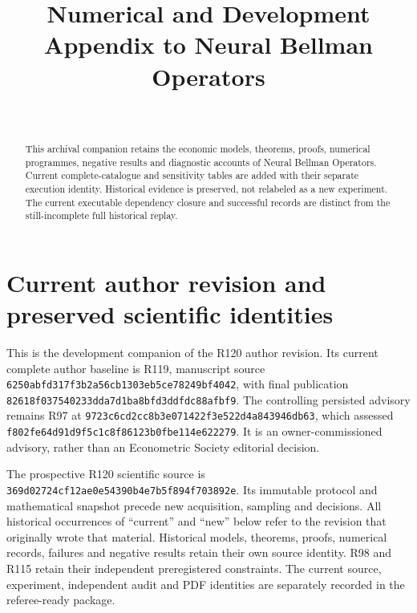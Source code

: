 \documentclass[ecta,nameyear,draft]{econsocart}
\begin{document}
\begin{frontmatter}
\title{Numerical and Development Appendix to Neural Bellman Operators}
\begin{aug}
\author[id=au1,addressref={add1}]{~}
\address[id=add1]{Peking University}
\end{aug}
\begin{abstract}This archival companion retains the economic models, theorems, proofs, numerical programmes, negative results and diagnostic accounts of Neural Bellman Operators. Current complete-catalogue and sensitivity tables are added with their separate execution identity. Historical evidence is preserved, not relabeled as a new experiment. The current executable dependency closure and successful records are distinct from the still-incomplete full historical replay.\end{abstract}
\end{frontmatter}
\appendix
\renewcommand{\thetheorem}{A.\arabic{theorem}}
\renewcommand{\theequation}{A.\arabic{equation}}
\renewcommand{\thesection}{\AlphAlph{\value{section}}}
\section{Current author revision and preserved scientific identities}\label{dev:custody120}
This is the development companion of the R120 author revision. Its current
complete author baseline is R119, manuscript source
\nolinkurl{6250abfd317f3b2a56cb1303eb5ce78249bf4042}, with final publication
\nolinkurl{82618f037540233dda7d1ba8bfd3ddfdc88afbf9}. The controlling persisted
advisory remains R97 at
\nolinkurl{9723c6cd2cc8b3e071422f3e522d4a843946db63}, which assessed
\nolinkurl{f802fe64d91d9f5c1c8f86123b0fbe114e622279}. It is an owner-commissioned
advisory, rather than an Econometric Society editorial decision.

The prospective R120 scientific source is
\nolinkurl{369d02724cf12ae0e54390b4e7b5f894f703892e}. Its immutable protocol
and mathematical snapshot precede new acquisition, sampling and decisions.
All historical occurrences of ``current'' and ``new'' below refer to the
revision that originally wrote that material. Historical models, theorems,
proofs, numerical records, failures and negative results retain their own
source identity. R98 and R115 retain their independent preregistered constraints.
The current source, experiment, independent audit and PDF identities are
separately recorded in the referee-ready package.
\end{document}
